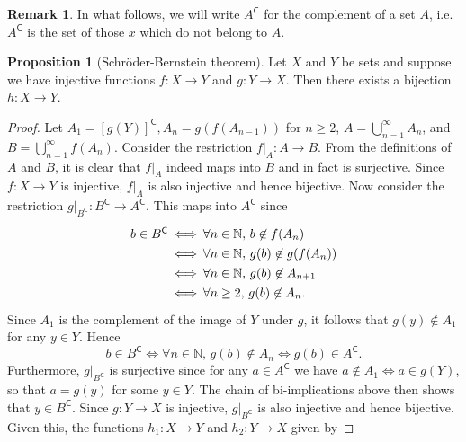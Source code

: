 \documentclass[12pt]{article}
\theoremstyle{definition}
\newtheorem{proposition}[definition]{Proposition}
\newtheorem*{remark}{Remark}
\begin{document}
\begin{remark}
    In what follows, we will write \( A^{\mathsf{C}} \) for the complement of a set \( A \), i.e.\ \( A^{\mathsf{C}} \) is the set of those \( x \) which do not belong to \( A \).
\end{remark}

\begin{proposition}[Schröder-Bernstein theorem]
\label{prop:schroder-bernstein_theorem}
    Let \( X \) and \( Y \) be sets and suppose we have injective functions \( f : X \to Y \) and \( g : Y \to X \). Then there exists a bijection \( h : X \to Y \).
\end{proposition}

\begin{proof}
    Let \( A_1 = [g(Y)]^{\mathsf{C}}, A_n = g(f(A_{n-1})) \) for \( n \geq 2 \), \( A = \bigcup_{n=1}^{\infty} A_n \), and \( B = \bigcup_{n=1}^{\infty} f(A_n) \). Consider the restriction \( f|_A : A \to B \). From the definitions of \( A \) and \( B \), it is clear that \( f|_A \) indeed maps into \( B \) and in fact is surjective. Since \( f : X \to Y \) is injective, \( f|_A \) is also injective and hence bijective. Now consider the restriction \( g|_{B^{\mathsf{C}}} : B^{\mathsf{C}} \to A^{\mathsf{C}} \). This maps into \( A^{\mathsf{C}} \) since
    \[
        \arraycolsep=1pt\def\arraystretch{1.3}
        \begin{array}{rcl}
            b \in B^{\mathsf{C}} & \iff & \forall n \in \mathbb{N},\, b \not\in f(A_n) \\
            & \iff & \forall n \in \mathbb{N},\, g(b) \not\in g(f(A_n)) \\
            & \iff & \forall n \in \mathbb{N},\, g(b) \not\in A_{n+1} \\
            & \iff & \forall n \geq 2,\, g(b) \not\in A_n. \\
        \end{array}
    \]
    Since \( A_1 \) is the complement of the image of \( Y \) under \( g \), it follows that \( g(y) \not\in A_1 \) for any \( y \in Y \). Hence
    \[
        b \in B^{\mathsf{C}} \iff \forall n \in \mathbb{N},\, g(b) \not\in A_n \iff g(b) \in A^{\mathsf{C}}.
    \]
    Furthermore, \( g|_{B^{\mathsf{C}}} \) is surjective since for any \( a \in A^{\mathsf{C}} \) we have \( a \not\in A_1 \iff a \in g(Y) \), so that \( a = g(y) \) for some \( y \in Y \). The chain of bi-implications above then shows that \( y \in B^{\mathsf{C}} \). Since \( g : Y \to X \) is injective, \( g|_{B^{\mathsf{C}}} \) is also injective and hence bijective. Given this, the functions \( h_1 : X \to Y \) and \( h_2 : Y \to X \) given by

\end{proof}
\end{document}
